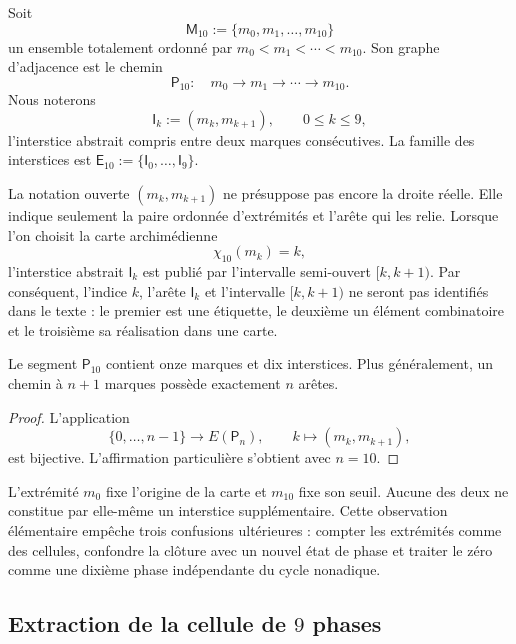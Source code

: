 \begin{definition}
Soit
\[
 \mathsf M_{10}:=\{m_0,m_1,\ldots,m_{10}\}
\]
un ensemble totalement ordonné par
\(m_0<m_1<\cdots<m_{10}\). Son graphe d’adjacence est le chemin
\[
 \mathsf P_{10}:\quad
 m_0\longrightarrow m_1\longrightarrow\cdots\longrightarrow m_{10}.
\]
Nous noterons
\[
 \mathsf I_k:=(m_k,m_{k+1}),\qquad 0\leq k\leq9,
\]
l’interstice abstrait compris entre deux marques consécutives. La
famille des interstices est
\(\mathsf E_{10}:=\{\mathsf I_0,\ldots,\mathsf I_9\}\).
\end{definition}

La notation ouverte \((m_k,m_{k+1})\) ne présuppose pas encore la droite réelle. Elle
indique seulement la paire ordonnée d’extrémités et l’arête qui les relie. Lorsque l’on choisit la
carte archimédienne
\[
 \chi_{10}(m_k)=k,
\]
l’interstice abstrait \(\mathsf I_k\) est publié par l’intervalle
semi-ouvert \([k,k+1)\). Par conséquent, l’indice \(k\), l’arête
\(\mathsf I_k\) et l’intervalle \([k,k+1)\) ne seront pas identifiés dans le texte :
le premier est une étiquette, le deuxième un élément combinatoire et le
troisième sa réalisation dans une carte.

\begin{lemma}
\label{p12-83-c1-s4:lem:censo-marcas-intersticios}
Le segment \(\mathsf P_{10}\) contient onze marques et dix interstices. Plus
généralement, un chemin à \(n+1\) marques possède exactement \(n\) arêtes.
\end{lemma}

\begin{proof}
L'application
\[
 \{0,\ldots,n-1\}\longrightarrow E(\mathsf P_n),
 \qquad k\longmapsto(m_k,m_{k+1}),
\]
est bijective. L’affirmation particulière s’obtient avec \(n=10\).
\end{proof}

L’extrémité \(m_0\) fixe l’origine de la carte et \(m_{10}\) fixe son seuil.
Aucune des deux ne constitue par elle-même un interstice supplémentaire. Cette
observation élémentaire empêche trois confusions ultérieures : compter les extrémités
comme des cellules, confondre la clôture avec un nouvel état de phase et traiter le zéro
comme une dixième phase indépendante du cycle nonadique.

\subsection{Extraction de la cellule de \(9\) phases}

